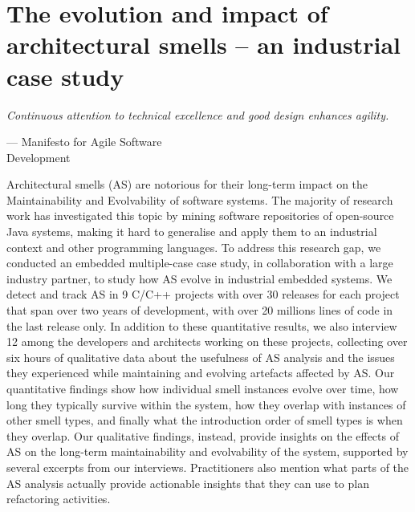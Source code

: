 \setlength{\headheight}{1.2cm}
\renewcommand{\publ}{\flushleft\footnotesize{Based on:\\[0.1cm]
		\textit{D. Sas, P. Avgeriou, and U. Uyumaz. "On the evolution and impact of architectural smells—an industrial case study." Empirical Software Engineering 27.4 (2022): 1-45.} \\[0.1cm]
}}

\chapter{The evolution and impact of architectural smells -- an industrial case study}
\label{chap:4}

\epigraph{\emph{Continuous attention to technical excellence
and good design enhances agility.}}{--- Manifesto for Agile Software\\Development}

\begin{Abstract}
	Architectural smells (AS) are notorious for their  long-term impact on the Maintainability and Evolvability of software systems.
	The majority of research work has investigated this topic by mining software repositories of open-source Java systems, making it hard to generalise and apply them to an industrial context and other programming languages.
	To address this research gap, we conducted an embedded multiple-case case study, in collaboration with a large industry partner, to study how AS evolve in industrial embedded systems.
	We detect and track AS in 9 C/C++ projects with over 30 releases for each project that span over two years of development, with over 20 millions lines of code in the last release only.
	In addition to these quantitative results, we also interview 12 among the developers and architects working on these projects, collecting over six hours of qualitative data about the usefulness of AS analysis and the issues they experienced while maintaining and evolving artefacts affected by AS.
	Our quantitative findings show how individual smell instances evolve over time, how long they typically survive within the system, how they overlap with instances of other smell types, and finally what the introduction order of smell types is when they overlap.
	Our qualitative findings, instead, provide insights on the effects of AS on the long-term maintainability and evolvability of the system, supported by several excerpts from our interviews. Practitioners also mention what parts of the AS analysis actually provide actionable insights that they can use to plan refactoring activities.
\end{Abstract}

